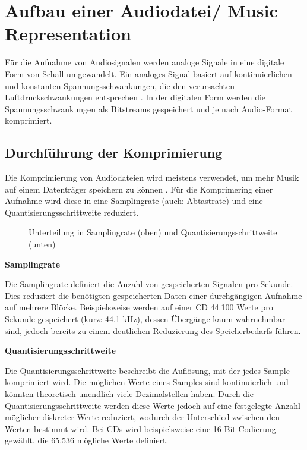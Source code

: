 %
\section{Aufbau einer Audiodatei/ Music Representation}
%

Für die Aufnahme von Audiosignalen werden analoge Signale in eine digitale Form von Schall umgewandelt. Ein analoges Signal basiert auf kontinuierlichen und konstanten Spannungsschwankungen, die den verursachten Luftdruckschwankungen entsprechen \parencite{digital_representation}. In der digitalen Form werden die Spannungsschwankungen als Bitstreams gespeichert und je nach Audio-Format komprimiert.

%
\subsection{Durchführung der Komprimierung}
\label{compression}
%

Die Komprimierung von Audiodateien wird meistens verwendet, um mehr Musik auf einem Datenträger speichern zu können \parencite{what_is_audio_compression}. Für die Komprimering einer Aufnahme wird diese in eine Samplingrate (auch: Abtastrate) und eine Quantisierungsschrittweite reduziert.

%
\begin{figure}[h]
    \caption{Unterteilung in Samplingrate (oben) und Quantisierungsschrittweite (unten)}
    \label{fig:samplingrate}
\end{figure}
%

\par

%
\textbf{Samplingrate}
%

Die Samplingrate definiert die Anzahl von gespeicherten Signalen pro Sekunde. Dies reduziert die benötigten gespeicherten Daten einer durchgängigen Aufnahme auf mehrere Blöcke. Beispielsweise werden auf einer CD 44.100 Werte pro Sekunde gespeichert (kurz: 44.1 kHz), dessen Übergänge kaum wahrnehmbar sind, jedoch bereits zu einem deutlichen Reduzierung des Speicherbedarfs führen.

%
\textbf{Quantisierungsschrittweite}
%

Die Quantisierungsschrittweite beschreibt die Auflösung, mit der jedes Sample komprimiert wird. Die möglichen Werte eines Samples sind kontinuierlich und könnten theoretisch unendlich viele Dezimalstellen haben. Durch die Quantisierungsschrittweite werden diese Werte jedoch auf eine festgelegte Anzahl möglicher diskreter Werte reduziert, wodurch der Unterschied zwischen den Werten bestimmt wird. Bei CDs wird beispielsweise eine 16-Bit-Codierung gewählt, die 65.536 mögliche Werte definiert.

